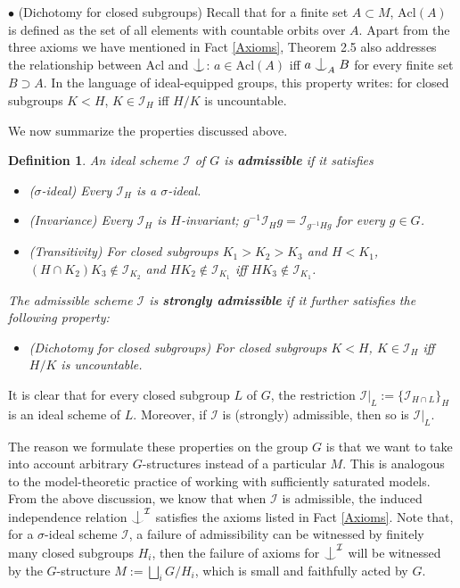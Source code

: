 \documentclass{article}
\newtheorem{definition}{Definition}
\newcommand{\Acl}{\mathrm{Acl}}
\newcommand{\I}{\mathcal{I}}
\newcommand{\ind}{\mathrel{\raise0.2ex\hbox{\ooalign{\hidewidth$\vert$\hidewidth\cr\raise-0.9ex\hbox{$\smile$}}}}}
\begin{document}
$\bullet$ (Dichotomy for closed subgroups)
Recall that for a finite set $A\subset M$, $\Acl(A)$ is defined as the set of all elements with countable orbits over $A$. Apart from the three axioms we have mentioned in Fact \ref{Axioms}, \cite{KP} Theorem 2.5 also addresses the relationship between $\Acl$
and $\ind$: $a\in \Acl(A)$ iff $a\ind_A B$ for every finite set $B\supset A$. In the language of ideal-equipped groups, this property writes: for closed subgroups $K<H$, $K \in \I_H$ iff 
$H/K$ is uncountable.


We now summarize the properties discussed above.

\begin{definition}\label{admissible}
An  ideal scheme $\I$  of $G$ is \textbf{admissible} if it satisfies
\begin{itemize}
\item ($\sigma$-ideal) Every $\I_H$ is a $\sigma$-ideal.

\item (Invariance) 
Every $\I_H$ is $H$-invariant; $g^{-1}\I_H g=\I_{g^{-1}Hg}$ for every $g\in G$.
\item (Transitivity) For closed subgroups $K_1>K_2>K_3$ and $H<K_1$,$(H\cap K_2)K_3\notin \I_{K_2}$ and $H K_2\notin \I_{K_1}$ iff $HK_3\notin \I_{K_1}$.
\end{itemize}

The admissible scheme $\I$ is  \textbf{strongly admissible} if it further satisfies the following property:
\begin{itemize}
\item (Dichotomy for closed subgroups) For closed subgroups $K<H$, $K \in \I_H$ iff 
$H/K$ is uncountable.
\end{itemize}
\end{definition}

It is clear that for every closed subgroup $L$ of $G$, the restriction $\I|_L:=\{\I_{H\cap L}\}_H$ is an ideal scheme of $L$. Moreover, if $\I$ is (strongly) admissible, then so is $\I|_L$.

The reason we formulate these properties on the group $G$ is that we want to take into account arbitrary $G$-structures instead of a particular $M$. This is analogous to the model-theoretic practice of working with sufficiently saturated models. From the above discussion, we know that when $\I$ is admissible, the induced independence relation $\ind^\I$ satisfies the axioms listed in  Fact \ref{Axioms}. Note that, for a $\sigma$-ideal scheme $\I$, a failure of admissibility can be witnessed by finitely many closed subgroups $H_i$, then the failure of axioms for $\ind^\I$ will be witnessed by the $G$-structure $M:=\bigsqcup_i G/H_i$, which is small and faithfully acted by $G$.
\end{document}
